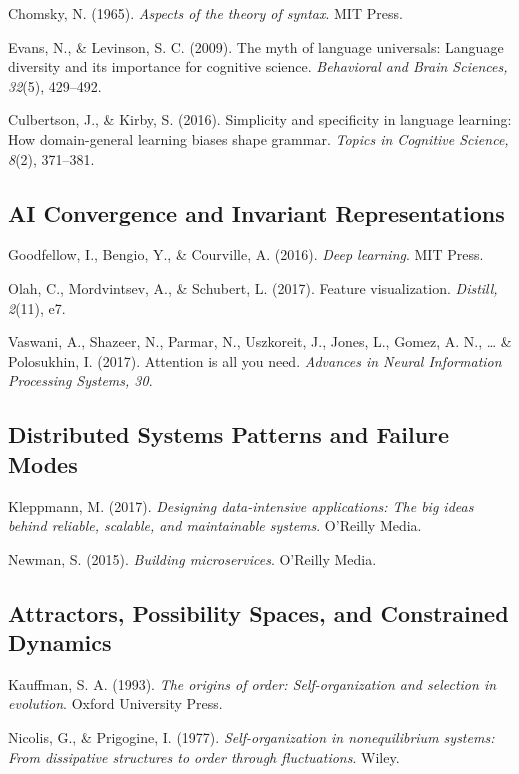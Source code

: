 \documentclass[
  openright]{book}
\begin{document}
Chomsky, N. (1965). \emph{Aspects of the theory of syntax}. MIT Press.

Evans, N., \& Levinson, S. C. (2009). The myth of language universals:
Language diversity and its importance for cognitive science.
\emph{Behavioral and Brain Sciences, 32}(5), 429--492.

Culbertson, J., \& Kirby, S. (2016). Simplicity and specificity in
language learning: How domain-general learning biases shape grammar.
\emph{Topics in Cognitive Science, 8}(2), 371--381.

\subsection{AI Convergence and Invariant
Representations}\label{ai-convergence-and-invariant-representations-1}

Goodfellow, I., Bengio, Y., \& Courville, A. (2016). \emph{Deep
learning}. MIT Press.

Olah, C., Mordvintsev, A., \& Schubert, L. (2017). Feature
visualization. \emph{Distill, 2}(11), e7.

Vaswani, A., Shazeer, N., Parmar, N., Uszkoreit, J., Jones, L., Gomez,
A. N., \ldots{} \& Polosukhin, I. (2017). Attention is all you need.
\emph{Advances in Neural Information Processing Systems, 30}.

\subsection{Distributed Systems Patterns and Failure
Modes}\label{distributed-systems-patterns-and-failure-modes}

Kleppmann, M. (2017). \emph{Designing data-intensive applications: The
big ideas behind reliable, scalable, and maintainable systems}. O'Reilly
Media.

Newman, S. (2015). \emph{Building microservices}. O'Reilly Media.

\subsection{Attractors, Possibility Spaces, and Constrained
Dynamics}\label{attractors-possibility-spaces-and-constrained-dynamics}

Kauffman, S. A. (1993). \emph{The origins of order: Self-organization
and selection in evolution}. Oxford University Press.

Nicolis, G., \& Prigogine, I. (1977). \emph{Self-organization in
nonequilibrium systems: From dissipative structures to order through
fluctuations}. Wiley.
\end{document}
